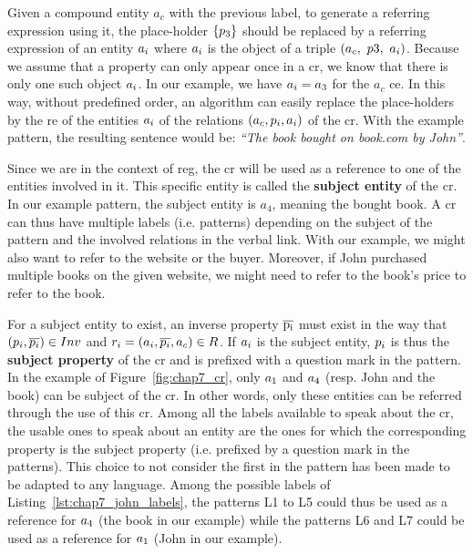 Given a compound entity $a_c$ with the previous label, to generate a referring expression using it, the place-holder $\{p_3\}$ should be replaced by a referring expression of an entity $a_i$ where $a_i$ is the object of a triple $(a_c,\ p3,\ a_i)$. Because we assume that a property can only appear once in a \acrshort{cr}, we know that there is only one such object $a_i$. In our example, we have $a_i = a_3$ for the $a_c$ \acrshort{ce}.
In this way, without predefined order, an algorithm can easily replace the place-holders by the \acrshort{re} of the entities $a_i$ of the relations $(a_c, p_i, a_i)$ of the \acrshort{cr}. With the example pattern, the resulting sentence would be: \textit{``The book bought on book.com by John''}.

Since we are in the context of \acrshort{reg}, the \acrshort{cr} will be used as a reference to one of the entities involved in it. This specific entity is called the \textbf{subject entity} of the \acrshort{cr}. In our example pattern, the subject entity is $a_4$, meaning the bought book. A \acrshort{cr} can thus have multiple labels (i.e. patterns) depending on the subject of the pattern and the involved relations in the verbal link. With our example, we might also want to refer to the website or the buyer. Moreover, if John purchased multiple books on the given website, we might need to refer to the book's price to refer to the book.

For a subject entity to exist, an inverse property $\overline{\rm p_i}$ must exist in the way that $(p_i, \overline{p_i}) \in Inv$ and $r_i = (a_i, \overline{p_i}, a_c) \in R$. If $a_i$ is the subject entity, $p_i$ is thus the \textbf{subject property} of the \acrshort{cr} and is prefixed with a question mark in the pattern. In the example of Figure~\ref{fig:chap7_cr}, only $a_1$ and $a_4$ (resp. John and the book) can be subject of the \acrshort{cr}. In other words, only these entities can be referred through the use of this \acrshort{cr}. Among all the labels available to speak about the \acrshort{cr}, the usable ones to speak about an entity are the ones for which the corresponding property is the subject property (i.e. prefixed by a question mark in the patterns). This choice to not consider the first in the pattern has been made to be adapted to any language. Among the possible labels of Listing~\ref{lst:chap7_john_labels}, the patterns L1 to L5 could thus be used as a reference for $a_4$ (the book in our example) while the patterns L6 and L7 could be used as a reference for $a_1$ (John in our example).

